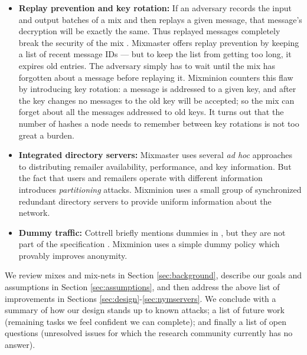 \documentclass[11pt]{IEEEtran}
\begin{document}
\begin{itemize}
\item \textbf{Replay prevention and key rotation:} 
If an adversary records the input and output batches of a mix and then
replays a given message, that message's decryption will be exactly the
same. Thus replayed messages completely break the security of the mix
\cite{chaum-mix}. Mixmaster offers replay prevention by
keeping a list of recent message IDs --- but to keep the list from
getting too long, it expires old entries. The adversary simply has to
wait until the mix has forgotten about a
message before replaying it. Mixminion counters this flaw by introducing
key rotation: a message is addressed to a given key, and after the key
changes no messages to the old key will be accepted; so the mix can forget
about all the messages addressed to old keys. It turns out that the
number of hashes a node needs to remember between key rotations is not
too great a burden.

\item \textbf{Integrated directory servers:} Mixmaster uses several \emph{ad hoc}
approaches to distributing remailer availability, performance, and
key information. But the fact that users and remailers operate with
different information introduces \emph{partitioning} attacks. Mixminion
uses a small group of synchronized redundant directory servers
to provide uniform information about the network.

\item \textbf{Dummy traffic:} Cottrell briefly mentions dummies in
\cite{mixmaster-attacks}, but they are not part of the specification
\cite{mixmaster-spec}. Mixminion uses a simple dummy policy which provably
improves anonymity.

\end{itemize}


We review mixes and mix-nets in Section \ref{sec:background},
describe our goals and assumptions in Section \ref{sec:assumptions},
and then address the above list of improvements in Sections
\ref{sec:design}-\ref{sec:nymservers}. We conclude with a summary of how
our design stands up to known attacks; a list of future
work (remaining tasks we feel confident we can complete);
and finally a list of open questions (unresolved issues for which the
research community currently has no answer).
\end{document}
